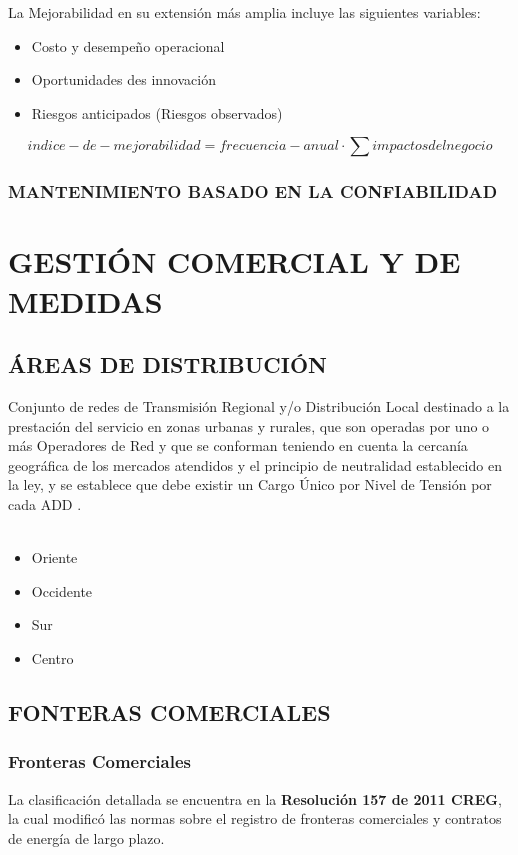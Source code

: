 \documentclass[a5paper]{book}%
\begin{document}
La Mejorabilidad en su extensión más amplia incluye las siguientes variables:

\begin{itemize}
\item Costo y desempeño operacional
\item Oportunidades des innovación
\item Riesgos anticipados (Riesgos observados)
\end{itemize}

\[ indice-de-mejorabilidad = frecuencia-anual \cdot \sum impactos del negocio\]


\section{MANTENIMIENTO BASADO EN LA CONFIABILIDAD}


\part{GESTIÓN COMERCIAL Y DE MEDIDAS}

\chapter{ÁREAS DE DISTRIBUCIÓN}
Conjunto de redes de Transmisión Regional y/o Distribución Local
destinado a la prestación del servicio en zonas urbanas y rurales, que
son operadas por uno o más Operadores de Red y que se conforman
teniendo en cuenta la cercanía geográfica de los mercados atendidos y
el principio de neutralidad establecido en la ley, y se establece que
debe existir un Cargo Único por Nivel de Tensión por cada ADD \cite{CREG1332013}.\\\\
\begin{itemize}
\item Oriente
\item  Occidente
\item  Sur 
\item  Centro
\end{itemize}


\chapter{FONTERAS COMERCIALES}  

\section{Fronteras Comerciales}
La clasificación detallada se encuentra en la \textbf{Resolución 157 de 2011 CREG}, la cual modificó las normas sobre el registro de fronteras comerciales y contratos de energía de largo plazo.
\end{document}
